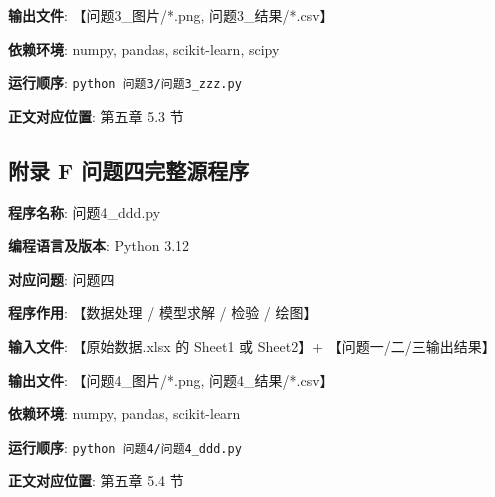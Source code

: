\textbf{输出文件}: 【问题3\_图片/*.png, 问题3\_结果/*.csv】

\textbf{依赖环境}: numpy, pandas, scikit-learn, scipy

\textbf{运行顺序}: \texttt{python 问题3/问题3\_zzz.py}

\textbf{正文对应位置}: 第五章 5.3 节


\subsection*{附录 F \quad 问题四完整源程序}

\textbf{程序名称}: 问题4\_ddd.py

\textbf{编程语言及版本}: Python 3.12

\textbf{对应问题}: 问题四

\textbf{程序作用}: 【数据处理 / 模型求解 / 检验 / 绘图】

\textbf{输入文件}: 【原始数据.xlsx 的 Sheet1 或 Sheet2】+ 【问题一/二/三输出结果】

\textbf{输出文件}: 【问题4\_图片/*.png, 问题4\_结果/*.csv】

\textbf{依赖环境}: numpy, pandas, scikit-learn

\textbf{运行顺序}: \texttt{python 问题4/问题4\_ddd.py}

\textbf{正文对应位置}: 第五章 5.4 节


